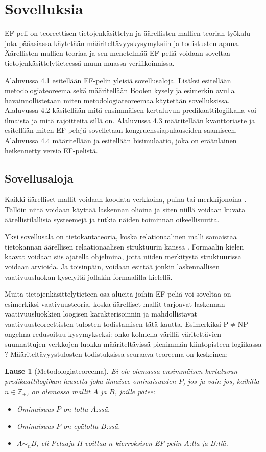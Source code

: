 \documentclass[finnish]{tktltiki2}
\newtheorem{lau}{Lause}
\theoremstyle{definition}
\theoremstyle{remark}
\begin{document}
\section{Sovelluksia}
EF-peli on teoreettisen tietojenkäsittelyn ja äärellisten mallien teorian työkalu jota pääasiassa käytetään määriteltävyyskysymyksiin ja todistusten apuna. Äärellisten mallien teoriaa ja sen menetelmää EF-peliä voidaan soveltaa tietojenkäsittelytieteessä muun muassa verifikoinnissa. 

Alaluvussa 4.1 esitellään EF-pelin yleisiä sovellusaloja. Lisäksi esitellään metodologiateoreema sekä määritellään Boolen kysely ja esimerkin avulla havainnollistetaan miten metodologiateoreemaa käytetään sovelluksissa. Alaluvussa 4.2 käsitellään mitä ensimmäisen kertaluvun predikaattilogiikalla voi ilmaista ja mitä rajoitteita sillä on. Alaluvussa 4.3 määritellään kvanttoriaste ja esitellään miten EF-pelejä sovelletaan kongruenssiapulauseiden saamiseen. Alaluvussa 4.4 määritellään ja esitellään bisimulaatio, joka on eräänlainen heikennetty versio EF-pelistä.

\subsection{Sovellusaloja}
Kaikki äärelliset mallit voidaan koodata verkkoina, puina tai merkkijonoina \cite{Ebb99}. Tällöin niitä voidaan käyttää laskennan olioina ja siten niillä voidaan kuvata äärellistilallisia systeemejä ja tutkia näiden toiminnan oikeellisuutta. 

Yksi sovellusala on tietokantateoria, koska relationaalinen malli samaistaa tietokannan äärellisen relaationaalisen struktuurin kanssa \cite{Luo10}. Formaalin kielen kaavat voidaan siis ajatella ohjelmina, jotta niiden merkitystä struktuurissa voidaan arvioida. Ja toisinpäin, voidaan esittää jonkin laskennallisen vaativuusluokan kyselyitä jollakin formaalilla kielellä.

Muita tietojenkäsittelytieteen osa-alueita joihin EF-peliä voi soveltaa on esimerkiksi vaativuusteoria, koska äärelliset mallit tarjoavat laskennan vaativuusluokkien loogisen karakterisoinnin ja mahdollistavat vaativuusteoreettisten tulosten todistamisen tätä kautta. Esimerkiksi $\mathrm{P} \neq \mathrm{NP}$ -ongelma redusoituu kysymykseksi: onko kolmella värillä väritettävien suunnattujen verkkojen luokka määriteltävissä pienimmän kiintopisteen logiikassa \cite{Imm86}? Määriteltävyystulosten todistuksissa seuraava teoreema on keskeinen:

\begin{lau}[Metodologiateoreema]
Ei ole olemassa ensimmäisen kertaluvun predikaattilogiikan lausetta joka ilmaisee ominaisuuden $P$, jos ja vain jos, kaikilla $n \in \mathbb{Z}_+$, on olemassa mallit $A$ ja $B$, joille pätee:
\begin{itemize}
\item Ominaisuus $P$ on totta $A$:ssä.
\item Ominaisuus $P$ on epätotta $B$:ssä.
\item $A \sim_n B$, eli Pelaaja II voittaa $n$-kierroksisen EF-pelin $A$:lla ja $B$:llä.
\end{itemize}
\end{lau}
\end{document}
